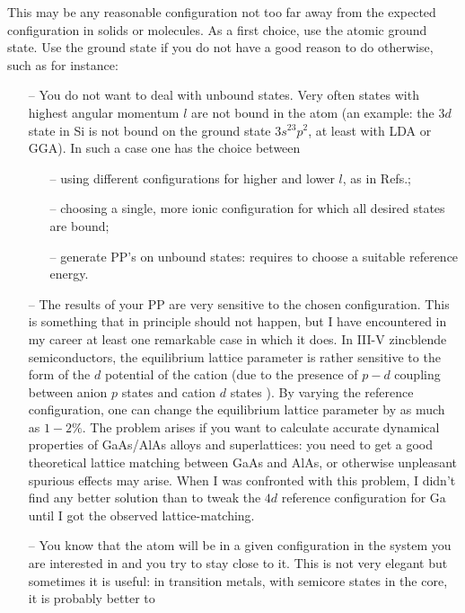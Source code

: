 This may be any reasonable configuration not too far away from
the expected configuration in solids or molecules. As a first
choice, use the atomic ground state. Use the ground state if you 
do not have a good reason to do otherwise, such as for instance:
\begin{enumerate}
\item[--]
   You do not want to deal with unbound states.
   Very often states with highest angular momentum $l$ are not bound
   in the atom (an example: the $3d$ state in Si is not bound on the
   ground state $3s^23p^2$, at least with LDA or GGA). In such a case 
   one has the choice between 
   \begin{enumerate} 
      \item[--] using different configurations for higher and lower $l$, 
                as in Refs.\cite{BHS,Gonze};
      \item[--] choosing a single, more ionic configuration for which 
                all desired states are bound;
      \item[--] generate PP's on unbound states: requires to choose
                a suitable reference energy.
   \end{enumerate}
\item[--]
   The results of your PP are very sensitive to the chosen configuration.
   This is something that in principle should not happen, but
   I have encountered in my career at least one remarkable case
   in which it does. In III-V zincblende semiconductors, the 
   equilibrium lattice parameter is rather sensitive to the form
   of the $d$ potential of the cation (due to the presence of $p-d$ 
   coupling between anion $p$ states and cation $d$ states 
   \cite{Zunger}). By varying the reference configuration, one 
   can change the equilibrium lattice parameter by as much as $1-2\%$. 
   The problem arises if you want to calculate accurate dynamical
   properties of GaAs/AlAs alloys and superlattices: you need to
   get a good theoretical lattice matching between GaAs and AlAs,
   or otherwise unpleasant spurious effects may arise. When I was 
   confronted with this problem, I didn't find any better solution
   than to tweak the $4d$ reference configuration for Ga until I got
   the observed lattice-matching.
\item[--]
   You know that the atom will be in a given configuration in the
   system you are interested in and you try to stay close to it.
   This is not very elegant but sometimes it is useful: in transition
   metals, with semicore states in the core, it is probably better to

\end{enumerate}
